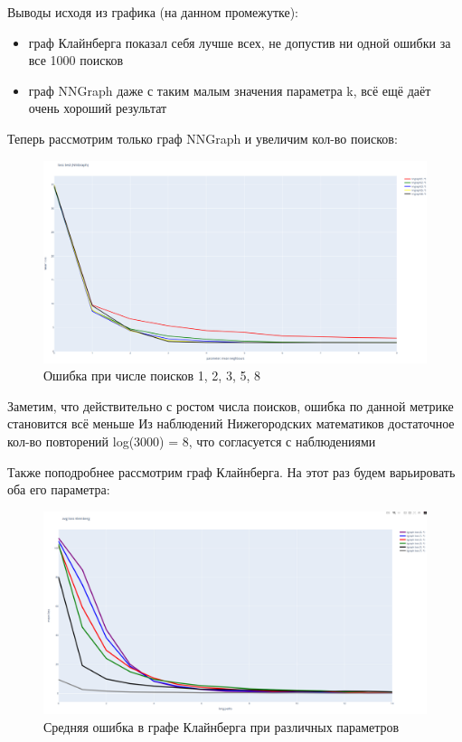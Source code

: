 Выводы исходя из графика (на данном промежутке):

\begin{itemize}
    \item граф Клайнберга показал себя лучше всех, не допустив ни одной ошибки за все 1000 поисков
    \item граф NNGraph даже с таким малым значения параметра k, всё ещё даёт очень хороший результат
\end{itemize}

Теперь рассмотрим только граф NNGraph и увеличим кол-во поисков:
\begin{figure}[H]
    \centering
    \includegraphics[scale=0.25]{./pictures/sum_loss_Ponomarenko.png}
    \caption{Ошибка при числе поисков 1, 2, 3, 5, 8} \label{sum_loss_Ponomarenko}
\end{figure}

Заметим, что действительно с ростом числа поисков, ошибка по данной метрике стано\-вится всё меньше
Из наблюдений Нижегородских математиков достаточное кол-во повто\-рений log(3000) = 8, что согласуется
с наблюдениями

Также поподробнее рассмотрим граф Клайнберга. На этот раз будем варьировать оба его параметра:

\begin{figure}[H]
    \centering
    \includegraphics[scale=0.25]{./pictures/Kleinberg_different_parametrs_loss.png}
    \caption{Средняя ошибка в графе Клайнберга при различных параметров} \label{Kleinberg_different_parameters_loss}
\end{figure}

